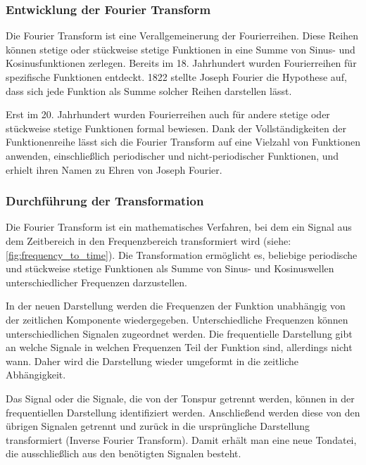 %
\subsubsection{Entwicklung der Fourier Transform}
%

Die Fourier Transform ist eine Verallgemeinerung der Fourierreihen. Diese Reihen können stetige oder stückweise stetige Funktionen in eine Summe von Sinus- und Kosinusfunktionen zerlegen. Bereits im 18. Jahrhundert wurden Fourierreihen für spezifische Funktionen entdeckt. 1822 stellte Joseph Fourier die Hypothese auf, dass sich jede Funktion als Summe solcher Reihen darstellen lässt.

\par

Erst im 20. Jahrhundert wurden Fourierreihen auch für andere stetige oder stückweise stetige Funktionen formal bewiesen. Dank der Vollständigkeiten der Funktionenreihe lässt sich die Fourier Transform auf eine Vielzahl von Funktionen anwenden, einschließlich periodischer und nicht-periodischer Funktionen, und erhielt ihren Namen zu Ehren von Joseph Fourier.

%
\subsubsection{Durchführung der Transformation}
%

Die Fourier Transform ist ein mathematisches Verfahren, bei dem ein Signal aus dem Zeitbereich in den Frequenzbereich transformiert wird (siehe: \cref{fig:frequency_to_time}). Die Transformation ermöglicht es, beliebige periodische und stückweise stetige Funktionen als Summe von Sinus- und Kosinuswellen unterschiedlicher Frequenzen darzustellen.

\par

In der neuen Darstellung werden die Frequenzen der Funktion unabhängig von der zeitlichen Komponente wiedergegeben. Unterschiedliche Frequenzen können unterschiedlichen Signalen zugeordnet werden. Die frequentielle Darstellung gibt an welche Signale in welchen Frequenzen Teil der Funktion sind, allerdings nicht wann. Daher wird die Darstellung wieder umgeformt in die zeitliche Abhängigkeit.

\par

Das Signal oder die Signale, die von der Tonspur getrennt werden, können in der frequentiellen Darstellung identifiziert werden. Anschließend werden diese von den übrigen Signalen getrennt und zurück in die ursprüngliche Darstellung transformiert (Inverse Fourier Transform). Damit erhält man eine neue Tondatei, die ausschließlich aus den benötigten Signalen besteht.

